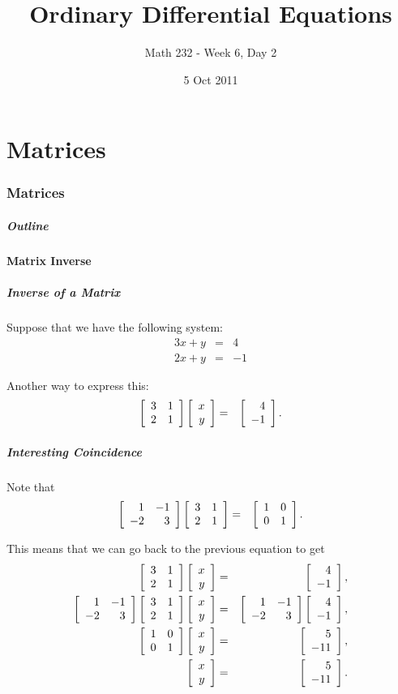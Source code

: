 \part{Matrices}
\section{Matrices}

\title{Ordinary Differential Equations}
\subtitle{Math 232 - Week 6, Day 2}
\date{5 Oct 2011}

\begin{frame}
  \titlepage
\end{frame}

\begin{frame}
  \frametitle{Outline}
\end{frame}


\subsection{Matrix Inverse}


\begin{frame}
  \frametitle{Inverse of a Matrix}

  Suppose that we have the following system:
  \begin{eqnarray*}
    3x + y & = & 4 \\
    2x + y & = & -1
  \end{eqnarray*}

  Another way to express this:
  \begin{eqnarray*}
    \arrayTwo{3}{1}{2}{1} \vecTwo{x}{y} & = & \vecTwo{4}{-1}.
  \end{eqnarray*}

\end{frame}


\begin{frame}
  \frametitle{Interesting Coincidence}

  Note that
  \begin{eqnarray*}
    \arrayTwo{1}{-1}{-2}{3} \arrayTwo{3}{1}{2}{1}  & = & \arrayTwo{1}{0}{0}{1}.
  \end{eqnarray*}

  This means that we can go back to the previous equation to get
  \begin{eqnarray*}
    \arrayTwo{3}{1}{2}{1} \vecTwo{x}{y} & = & \vecTwo{4}{-1}, \\
    \arrayTwo{1}{-1}{-2}{3} \arrayTwo{3}{1}{2}{1} \vecTwo{x}{y} & = & 
          \arrayTwo{1}{-1}{-2}{3}\vecTwo{4}{-1}, \\
    \arrayTwo{1}{0}{0}{1} \vecTwo{x}{y} & = & \vecTwo{5}{-11}, \\
    \vecTwo{x}{y} & = & \vecTwo{5}{-11}.
  \end{eqnarray*}


\end{frame}

